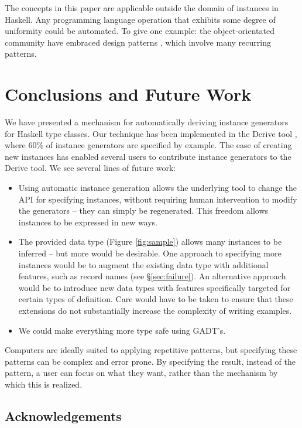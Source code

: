 \documentclass[preprint,draft]{sigplanconf}
\begin{document}
The concepts in this paper are applicable outside the domain of instances in Haskell. Any programming language operation that exhibits some degree of uniformity could be automated. To give one example: the object-orientated community have embraced design patterns \cite{design_patterns}, which involve many recurring patterns.

\section{Conclusions and Future Work}
\label{sec:conclusion}


We have presented a mechanism for automatically deriving instance generators for Haskell type classes. Our technique has been implemented in the Derive tool \cite{derive}, where 60\% of instance generators are specified by example. The ease of creating new instances has enabled several users to contribute instance generators to the Derive tool. We see several lines of future work:

\begin{itemize}
\item Using automatic instance generation allows the underlying tool to change the API for specifying instances, without requiring human intervention to modify the generators -- they can simply be regenerated. This freedom allows instances to be expressed in new ways.
\item The provided data type (Figure \ref{fig:sample}) allows many instances to be inferred -- but more would be desirable. One approach to specifying more instances would be to augment the existing data type with additional features, such as record names (see \S\ref{sec:failure}). An alternative approach would be to introduce new data types with features specifically targeted for certain types of definition. Care would have to be taken to ensure that these extensions do not substantially increase the complexity of writing examples.
\item We could make everything more type safe using GADT's.
\end{itemize}

Computers are ideally suited to applying repetitive patterns, but specifying these patterns can be complex and error prone. By specifying the result, instead of the pattern, a user can focus on what they want, rather than the mechanism by which this is realized.

\subsection*{Acknowledgements}
\end{document}
